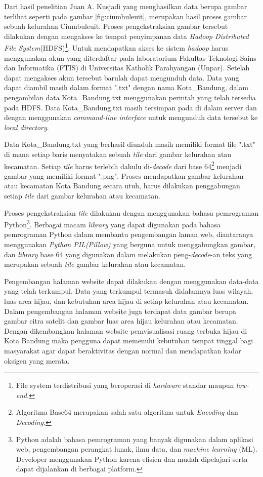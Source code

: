 Dari hasil penelitian Juan A. Kusjadi yang menghasilkan data  berupa gambar terlihat seperti pada gambar \ref{fig:ciumbuleuit}, merupakan hasil proses gambar sebuah kelurahan Ciumbuleuit. Proses pengekstraksian gambar tersebut dilakukan dengan mengakses ke tempat penyimpanan data \textit{Hadoop Distributed File System}(HDFS)\footnote{File system terdistribusi yang beroperasi di \textit{hardware} standar maupun \textit{low-end}.}. Untuk mendapatkan akses ke sistem \textit{hadoop} harus menggunakan akun yang diterdaftar pada laboratorium Fakultas Teknologi Sains dan Informatika (FTIS) di Universitas Katholik Parahyangan (Unpar). Setelah dapat mengakses akun tersebut barulah dapat mengunduh data. Data yang dapat diambil masih dalam format ".txt" dengan nama Kota\_Bandung, dalam pengambilan data Kota\_Bandung.txt menggunakan perintah yang telah tersedia pada HDFS. Data Kota\_Bandung.txt masih tersimpan pada di dalam server dan dengan menggunakan \textit{command-line interface} untuk mengunduh data tersebut ke \textit{local directory}.

Data Kota\_Bandung.txt yang berhasil diunduh masih memiliki format file ".txt" di mana setiap baris menyatakan sebuah \textit{tile} dari gambar kelurahan atau kecamatan. Setiap \textit{tile} harus terlebih dahulu di-\textit{decode} dari base 64\footnote{Algoritma Base64 merupakan salah satu algoritma untuk \textit{Encoding} dan \textit{Decoding}.} menjadi gambar yang memiliki format ".png". Proses mendapatkan gambar kelurahan atau kecamatan Kota Bandung secara utuh, harus dilakukan penggabungan setiap \textit{tile} dari gambar kelurahan atau kecamatan.

Proses pengekstraksian \textit{tile} dilakukan dengan menggunakan bahasa pemrograman Python\footnote{Python adalah bahasa pemrograman yang banyak digunakan dalam aplikasi web, pengembangan perangkat lunak, ilmu data, dan \textit{machine learning} (ML). Developer menggunakan Python karena efisien dan mudah dipelajari serta dapat dijalankan di berbagai platform.}. Berbagai macam \textit{library} yang dapat digunakan pada bahasa pemrograman Python dalam membantu pengembangan laman web, diantaranya menggunakan \textit{Python PIL(Pillow)} yang berguna untuk menggabungkan gambar, dan \textit{library} base 64 yang digunakan dalam melakukan peng-\textit{decode}-an teks yang merupakan sebuah \textit{tile} gambar kelurahan atau kecamatan.

Pengembangan halaman website dapat dilakukan dengan menggunakan data-data yang telah terkumpul. Data yang terkumpul termasuk didalamnya luas wilayah, luas area hijau, dan kebutuhan area hijau di setiap kelurahan atau kecamatan. Dalam pengembangan halaman website juga terdapat data gambar berupa gambar citra satelit dan gambar luas area hijau kelurahan atau kecamatan. Dengan dikembangkan halaman website pemvisualisasi ruang terbuka hijau di Kota Bandung maka pengguna dapat memenuhi kebutuhan tempat tinggal bagi masyarakat agar dapat beraktivitas dengan normal dan mendapatkan kadar oksigen yang merata. 


